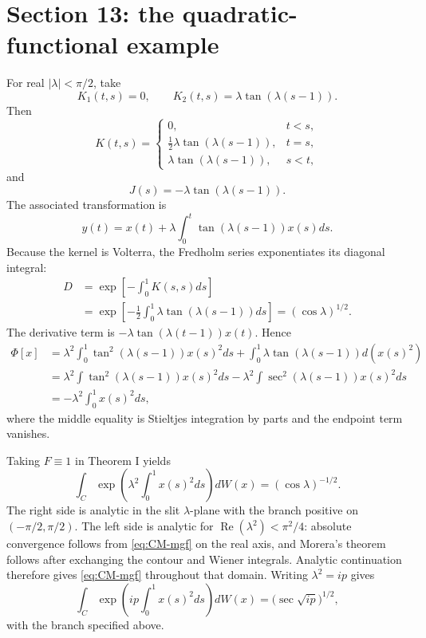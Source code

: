 \section{Section 13: the quadratic-functional example}

For real \(|\lambda|<\pi/2\), take
\[
 K_1(t,s)=0,
 \qquad
 K_2(t,s)=\lambda\tan(\lambda(s-1)).
\]
Then
\[
 K(t,s)=
 \begin{cases}
 0,&t<s,\\
 \frac12\lambda\tan(\lambda(s-1)),&t=s,\\
 \lambda\tan(\lambda(s-1)),&s<t,
 \end{cases}
\]
and
\[
 J(s)=-\lambda\tan(\lambda(s-1)).
\]
The associated transformation is
\[
 y(t)=x(t)+\lambda\int_0^t\tan(\lambda(s-1))x(s)ds.
\]
Because the kernel is Volterra, the Fredholm series exponentiates its diagonal integral:
\begin{align*}
 D
 &=\exp\left[-\int_0^1K(s,s)ds\right]\\
 &=\exp\left[-\frac12\int_0^1\lambda\tan(\lambda(s-1))ds\right]
 =(\cos\lambda)^{1/2}.
\end{align*}
The derivative term is \(-\lambda\tan(\lambda(t-1))x(t)\).  Hence
\begin{align*}
 \Phi[x]
 &=\lambda^2\int_0^1\tan^2(\lambda(s-1))x(s)^2ds
 +\int_0^1\lambda\tan(\lambda(s-1))d(x(s)^2)\\
 &=\lambda^2\int\tan^2(\lambda(s-1))x(s)^2ds
 -\lambda^2\int\sec^2(\lambda(s-1))x(s)^2ds\\
 &=-\lambda^2\int_0^1x(s)^2ds,
\end{align*}
where the middle equality is Stieltjes integration by parts and the endpoint term vanishes.

Taking \(F\equiv1\) in Theorem I yields
\begin{equation}
 \int_C\exp\left(\lambda^2\int_0^1x(s)^2ds\right)dW(x)
 =(\cos\lambda)^{-1/2}.
 \tag{13.12}\label{eq:CM-mgf}
\end{equation}
The right side is analytic in the slit \(\lambda\)-plane with the branch positive on \((-\pi/2,\pi/2)\).  The left side is analytic for \(\operatorname{Re}(\lambda^2)<\pi^2/4\): absolute convergence follows from \eqref{eq:CM-mgf} on the real axis, and Morera's theorem follows after exchanging the contour and Wiener integrals.  Analytic continuation therefore gives \eqref{eq:CM-mgf} throughout that domain.  Writing \(\lambda^2=ip\) gives
\[
 \int_C\exp\left(ip\int_0^1x(s)^2ds\right)dW(x)
 =\bigl(\sec\sqrt{ip}\bigr)^{1/2},
\]
with the branch specified above.

